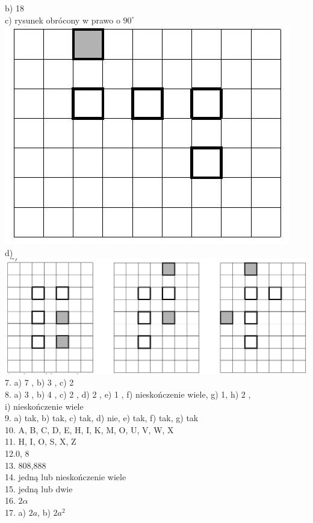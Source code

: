 \documentclass[10pt]{article}
\begin{document}
b) 18\\
c) rysunek obrócony w prawo o \(90^{\circ}\)\\
\includegraphics[max width=\textwidth, center]{2024_11_21_e9b4faa005d5be2cc318g-159(3)}\\
d)\\
\includegraphics[max width=\textwidth, center]{2024_11_21_e9b4faa005d5be2cc318g-160}\\
7. a) 7 , b) 3 , c) 2\\
8. a) 3 , b) 4 , c) 2 , d) 2 , e) 1 , f) nieskończenie wiele, g) 1, h) 2 ,\\
i) nieskończenie wiele\\
9. a) tak, b) tak, c) tak, d) nie, e) tak, f) tak, g) tak\\
10. A, B, C, D, E, H, I, K, M, O, U, V, W, X\\
11. H, I, O, S, X, Z\\
12.0, 8\\
13. 808,888\\
14. jedną lub nieskończenie wiele\\
15. jedną lub dwie\\
16. \(2 \alpha\)\\
17. a) \(2 a\), b) \(2 a^{2}\)
\end{document}
